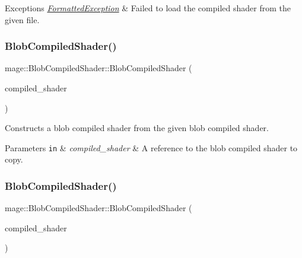 \begin{DoxyExceptions}{Exceptions}
{\em \hyperlink{classmage_1_1_formatted_exception}{Formatted\+Exception}} & Failed to load the compiled shader from the given file. \\
\hline
\end{DoxyExceptions}
\hypertarget{structmage_1_1_blob_compiled_shader_af7001d0e9c9a95f7ac9b9cc009bc1e94}{}\label{structmage_1_1_blob_compiled_shader_af7001d0e9c9a95f7ac9b9cc009bc1e94} 
\subsubsection{\texorpdfstring{Blob\+Compiled\+Shader()}{BlobCompiledShader()}\hspace{0.1cm}{\footnotesize\ttfamily [2/3]}}
{\footnotesize\ttfamily mage\+::\+Blob\+Compiled\+Shader\+::\+Blob\+Compiled\+Shader (\begin{DoxyParamCaption}\item[{const \hyperlink{structmage_1_1_blob_compiled_shader}{Blob\+Compiled\+Shader} \&}]{compiled\+\_\+shader }\end{DoxyParamCaption})\hspace{0.3cm}{\ttfamily [default]}}

Constructs a blob compiled shader from the given blob compiled shader.


\begin{DoxyParams}[1]{Parameters}
\mbox{\tt in}  & {\em compiled\+\_\+shader} & A reference to the blob compiled shader to copy. \\
\hline
\end{DoxyParams}
\hypertarget{structmage_1_1_blob_compiled_shader_a41e4b17557dd1d6172fd6afcb97fdd79}{}\label{structmage_1_1_blob_compiled_shader_a41e4b17557dd1d6172fd6afcb97fdd79} 
\subsubsection{\texorpdfstring{Blob\+Compiled\+Shader()}{BlobCompiledShader()}\hspace{0.1cm}{\footnotesize\ttfamily [3/3]}}
{\footnotesize\ttfamily mage\+::\+Blob\+Compiled\+Shader\+::\+Blob\+Compiled\+Shader (\begin{DoxyParamCaption}\item[{\hyperlink{structmage_1_1_blob_compiled_shader}{Blob\+Compiled\+Shader} \&\&}]{compiled\+\_\+shader }\end{DoxyParamCaption})\hspace{0.3cm}{\ttfamily [default]}}

